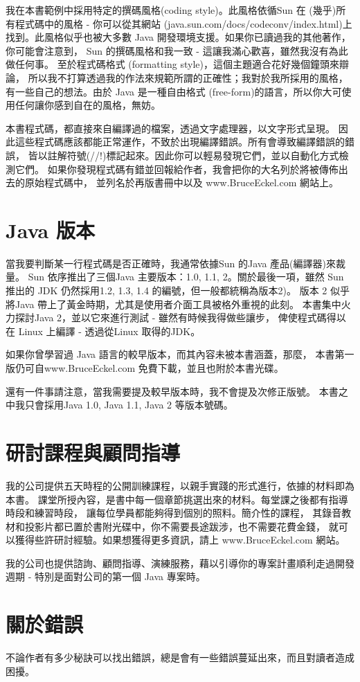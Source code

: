 我在本書範例中採用特定的撰碼風格(coding style)。此風格依循Sun 在
(幾乎)所有程式碼中的風格 - 你可以從其網站
(java.sun.com/docs/codeconv/index.html)上找到。此風格似乎也被大多數
Java 開發環境支援。如果你已讀過我的其他著作，你可能會注意到，
Sun 的撰碼風格和我一致 - 這讓我滿心歡喜，雖然我沒有為此做任何事。
至於程式碼格式 (formatting style)，這個主題適合花好幾個鐘頭來辯論，
所以我不打算透過我的作法來規範所謂的正確性；我對於我所採用的風格，
有一些自己的想法。由於 Java 是一種自由格式
(free-form)的語言，所以你大可使用任何讓你感到自在的風格，無妨。

本書程式碼，都直接來自編譯過的檔案，透過文字處理器，以文字形式呈現。
因此這些程式碼應該都能正常運作，不致於出現編譯錯誤。所有會導致編譯錯誤的錯誤，
皆以註解符號(//!)標記起來。因此你可以輕易發現它們，並以自動化方式檢測它們。
如果你發現程式碼有錯並回報給作者，我會把你的大名列於將被傳佈出去的原始程式碼中，
並列名於再版書冊中以及 www.BruceEckel.com 網站上。
\section{Java 版本}
當我要判斷某一行程式碼是否正確時，我通常依據Sun 的Java 產品(編譯器)來裁量。
Sun 依序推出了三個Java 主要版本：1.0, 1.1, 2。關於最後一項，雖然
Sun 推出的 JDK 仍然採用1.2, 1.3, 1.4 的編號，但一般都統稱為版本2)。
版本
2 似乎將Java 帶上了黃金時期，尤其是使用者介面工具被格外重視的此刻。
本書集中火力探討Java 2，並以它來進行測試 - 雖然有時候我得做些讓步，
俾使程式碼得以在 Linux 上編譯 - 透過從Linux 取得的JDK。

如果你曾學習過 Java 語言的較早版本，而其內容未被本書涵蓋，那麼，
本書第一版仍可自www.BruceEckel.com 免費下載，並且也附於本書光碟。

還有一件事請注意，當我需要提及較早版本時，我不會提及次修正版號。
本書之中我只會採用Java 1.0, Java 1.1, Java 2 等版本號碼。
\section{研討課程與顧問指導}
我的公司提供五天時程的公開訓練課程，以親手實踐的形式進行，依據的材料即為本書。
課堂所授內容，是書中每一個章節挑選出來的材料。每堂課之後都有指導時段和練習時段，
讓每位學員都能夠得到個別的照料。簡介性的課程，
其錄音教材和投影片都已置於書附光碟中，你不需要長途跋涉，也不需要花費金錢，
就可以獲得些許研討經驗。如果想獲得更多資訊，請上 www.BruceEckel.com 網站。

我的公司也提供諮詢、顧問指導、演練服務，藉以引導你的專案計畫順利走過開發週期 -
特別是面對公司的第一個 Java 專案時。
\section{關於錯誤}
不論作者有多少秘訣可以找出錯誤，總是會有一些錯誤蔓延出來，而且對讀者造成困擾。

